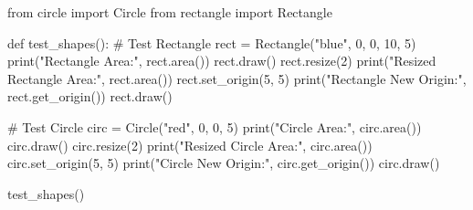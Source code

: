 \documentclass[
]{article}
\newenvironment{Shaded}{\begin{snugshade}}{\end{snugshade}}
\newcommand{\NormalTok}[1]{\textcolor[rgb]{0.00,0.23,0.31}{#1}}
\begin{document}
\begin{Shaded}
\begin{Highlighting}[]
\NormalTok{from circle import Circle}
\NormalTok{from rectangle import Rectangle}

\NormalTok{def test\_shapes():}
\NormalTok{    \# Test Rectangle}
\NormalTok{    rect = Rectangle("blue", 0, 0, 10, 5)}
\NormalTok{    print("Rectangle Area:", rect.area())}
\NormalTok{    rect.draw()}
\NormalTok{    rect.resize(2)}
\NormalTok{    print("Resized Rectangle Area:", rect.area())}
\NormalTok{    rect.set\_origin(5, 5)}
\NormalTok{    print("Rectangle New Origin:", rect.get\_origin())}
\NormalTok{    rect.draw()}

\NormalTok{    \# Test Circle}
\NormalTok{    circ = Circle("red", 0, 0, 5)}
\NormalTok{    print("Circle Area:", circ.area())}
\NormalTok{    circ.draw()}
\NormalTok{    circ.resize(2)}
\NormalTok{    print("Resized Circle Area:", circ.area())}
\NormalTok{    circ.set\_origin(5, 5)}
\NormalTok{    print("Circle New Origin:", circ.get\_origin())}
\NormalTok{    circ.draw()}

\NormalTok{test\_shapes()}
\end{Highlighting}
\end{Shaded}
\end{document}
